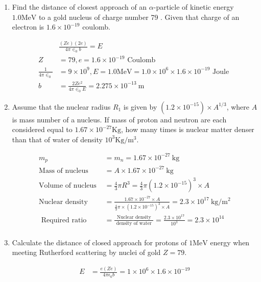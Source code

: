 \begin{enumerate}
	\item  Find the distance of closest approach of an $\alpha$-particle of kinetic energy $1.0 \mathrm{MeV}$ to a gold nucleus of charge number 79 . Given that charge of an electron is $1.6 \times 10^{-19}$ coulomb.
	\begin{answer}
		\begin{align*}
		&\frac{(Z e)(2 e)}{4 \pi \in_0 b}=E\\
		Z&=79, e=1.6 \times 10^{-19} \text { Coulomb } \\
		\frac{1}{4 \pi \in_0}&=9 \times 10^9, E=1.0 \mathrm{MeV}=1.0 \times 10^6 \times 1.6 \times 10^{-19} \text { Joule } \\
		b&=\frac{2 Z e^2}{4 \pi \in_0 E}=2.275 \times 10^{-13} \mathrm{~m}
		\end{align*}
	\end{answer}
	\item  Assume that the nuclear radius $R_1$ is given by $\left(1.2 \times 10^{-15}\right) \times A^{1 / 3}$, where $A$ is mass number of a nucleus. If mass of proton and neutron are each considered equal to $1.67 \times 10^{-27} \mathrm{Kg}$, how many times is nuclear matter denser than that of water of density $10^3 \mathrm{Kg} / \mathrm{m}^3$.
	\begin{answer}
		\begin{align*}
		m_p&=m_n=1.67 \times 10^{-27} \mathrm{~kg}\\
		\text{Mass of nucleus }&=A \times 1.67 \times 10^{-27} \mathrm{~kg}\\
		\text{Volume of nucleus }&=\frac{4}{3} \pi R^3=\frac{4}{3} \pi\left(1.2 \times 10^{-15}\right)^3 \times A\\
		\text{Nuclear density }&=\frac{1.67 \times 10^{-27} \times A}{\frac{4}{3} \pi \times\left(1.2 \times 10^{-15}\right)^3 \times A}=2.3 \times 10^{17} \mathrm{~kg} / \mathrm{m}^2\\
	\text{	Required ratio }&=\frac{\text { Nuclear density }}{\text { density of water }}=\frac{2.3 \times 10^{17}}{10^3}=2.3 \times 10^{14}\\
		\end{align*}
	\end{answer}
	\item  Calculate the distance of closed approach for protons of $1 \mathrm{MeV}$ energy when meeting Rutherford scattering by nuclei of gold $Z=79$.
	\begin{answer}
		\begin{align*}
		E&=\frac{e(Z e)}{4 \pi \epsilon_0 b}=1 \times 10^6 \times 1.6 \times 10^{-19}\\

\end{align*}
\end{answer}
\end{enumerate}

